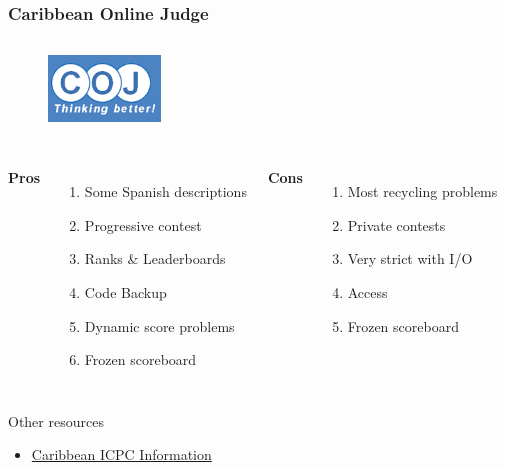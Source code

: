 \documentclass{beamer}
\begin{document}
\begin{frame}
	\frametitle{Caribbean Online Judge}
	\begin{figure}[t]
		\href{http://coj.uci.cu/general/faqs.xhtml?lang=es}{\includegraphics[width=3cm,height=2.5cm,keepaspectratio]{images/judges/coj}}
	\end{figure}
	
	\begin{columns}[c] %
		\textbf{Pros}
		\begin{enumerate}
			\item Some Spanish descriptions  
			\item Progressive contest
			\item Ranks \& Leaderboards
			\item Code Backup
			\item Dynamic score problems
			\item Frozen scoreboard
		\end{enumerate}
		\textbf{Cons}
		\begin{enumerate}
			\item Most recycling problems
			\item Private contests
			\item Very strict with I/O
			\item Access
			\item Frozen scoreboard
		\end{enumerate}
	\end{columns}
	\begin{block}{Other resources}
		\begin{itemize}
			\item \href{https://coj-forum.uci.cu/viewtopic.php?f=35&t=2846}{Caribbean ICPC Information} 
		\end{itemize}
	\end{block}

\end{frame}

\end{document}
